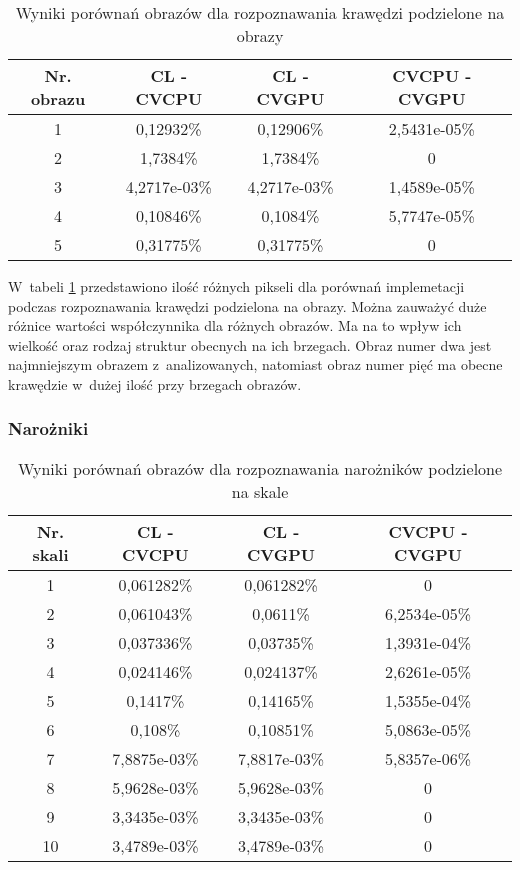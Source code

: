 \begin{center}
\begin{table}
\centering
\caption{Wyniki porównań obrazów dla rozpoznawania krawędzi podzielone na obrazy}
\label{tab:imageImageEdge}
\begin{tabular}{|c|c|c|c|}
\hline
Nr. obrazu & CL - CVCPU & CL - CVGPU & CVCPU - CVGPU \\ \hline
1 & 0,12932\% & 0,12906\% & 2,5431e-05\% \\ \hline
2 & 1,7384\% & 1,7384\% & 0 \\ \hline
3 & 4,2717e-03\% & 4,2717e-03\% & 1,4589e-05\% \\ \hline
4 & 0,10846\% & 0,1084\% & 5,7747e-05\% \\ \hline
5 & 0,31775\% & 0,31775\% & 0 \\ \hline
\end{tabular}
\end{table}
\end{center}

W~tabeli \ref{tab:imageImageEdge} przedstawiono ilość różnych pikseli dla porównań implemetacji podczas rozpoznawania krawędzi podzielona na obrazy. Można zauważyć duże różnice wartości współczynnika dla różnych obrazów. Ma na to wpływ ich wielkość oraz rodzaj struktur obecnych na ich brzegach. Obraz numer dwa jest najmniejszym obrazem z~analizowanych, natomiast obraz numer pięć ma obecne krawędzie w~dużej ilość przy brzegach obrazów.


\subsubsection{Narożniki}
\label{subsubsec:naroznikiTabele}

\begin{center}
\begin{table}
\centering
\centering
\caption{Wyniki porównań obrazów dla rozpoznawania narożników podzielone na skale}
\label{tab:imageScaleCorner}
\begin{tabular}{|c|c|c|c|}
 \hline
Nr. skali & CL - CVCPU & CL - CVGPU & CVCPU - CVGPU \\ \hline
1 & 0,061282\% & 0,061282\% & 0 \\ \hline
2 & 0,061043\% & 0,0611\% & 6,2534e-05\% \\ \hline
3 & 0,037336\% & 0,03735\% & 1,3931e-04\% \\ \hline
4 & 0,024146\% & 0,024137\% & 2,6261e-05\% \\ \hline
5 & 0,1417\% & 0,14165\% & 1,5355e-04\% \\ \hline
6 & 0,108\% & 0,10851\% & 5,0863e-05\% \\ \hline
7 & 7,8875e-03\% & 7,8817e-03\% & 5,8357e-06\% \\ \hline
8 & 5,9628e-03\% & 5,9628e-03\% & 0 \\ \hline
9 & 3,3435e-03\% & 3,3435e-03\% & 0 \\ \hline
10 & 3,4789e-03\% & 3,4789e-03\% & 0 \\ \hline
\end{tabular}
\end{table}
\end{center}

